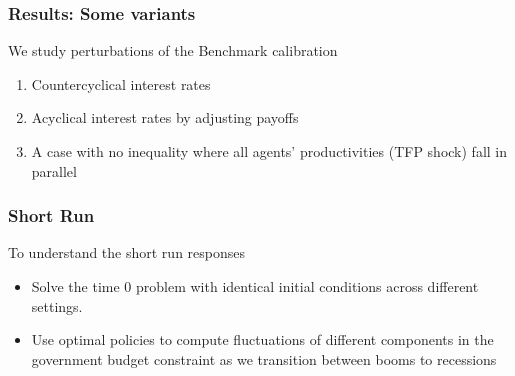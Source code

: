 \documentclass{beamer}
\begin{document}
\begin{frame}
 \frametitle{Results: Some variants }
 We study perturbations of the Benchmark calibration
 \begin{enumerate}
\item Countercyclical interest rates
\item Acyclical interest rates by adjusting payoffs
\item A case with no inequality where all agents' productivities (TFP shock) fall in parallel
\end{enumerate}

 \end{frame}
 


 \begin{frame}
  \frametitle{Short Run}
  To understand the short run responses
  \begin{itemize}
   \item Solve the time 0 problem with identical initial conditions across
different settings. 
\item Use  optimal policies to compute fluctuations of
different components in the government budget constraint as we transition between booms to recessions
  \end{itemize}
 \end{frame}
\end{document}
